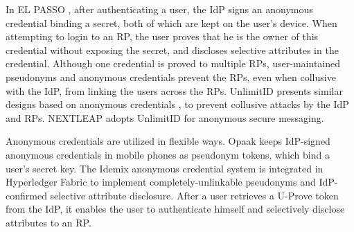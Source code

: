 
In EL PASSO \cite{ELPASSO}, after authenticating a user,
    the IdP signs an anonymous credential \cite{anon-credential} binding a secret,
         both of which are kept on the user's device.
When attempting to login to an RP,
    the user proves that he is the owner of this credential without exposing the secret,
        and discloses selective attributes in the credential.
Although one credential is proved to multiple RPs,
        user-maintained pseudonyms and anonymous credentials prevent the RPs, even when collusive with the IdP, from linking the users across the RPs.
UnlimitID \cite{UnlimitID} presents similar designs based on anonymous credentials \cite{anon-credential},
        to prevent collusive attacks by the IdP and RPs.
NEXTLEAP \cite{nextleap} adopts UnlimitID for anonymous secure messaging.


Anonymous credentials \cite{anon-credential-2001,anon-credential} are utilized in flexible ways.
Opaak \cite{Opaak} keeps IdP-signed anonymous credentials in mobile phones as pseudonym tokens,
    which bind a user's secret key.
The Idemix anonymous credential system \cite{idemix}
 is integrated in Hyperledger Fabric \cite{hyperledge-idemix} to implement completely-unlinkable pseudonyms
        and IdP-confirmed selective attribute disclosure.
After a user retrieves a U-Prove token \cite{uprov,uprove-conference} from the IdP,
    it enables the user to authenticate himself and selectively disclose attributes to an RP.

